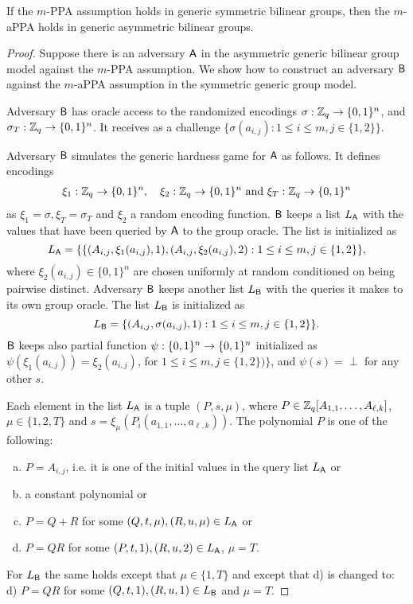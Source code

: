 \begin{theorem}
	If the $m$-PPA assumption holds in generic symmetric bilinear groups, then the $m$-aPPA holds in generic asymmetric bilinear groups.
\end{theorem}
\begin{proof}
Suppose there is an adversary $\mathsf{A}$  in the asymmetric generic bilinear group model against the $m$-PPA assumption.  We show how to construct an adversary $\mathsf{B}$ against the  $m$-aPPA assumption in the symmetric generic group model. 


Adversary $\mathsf{B}$ has oracle access to the randomized encodings $\sigma: \mathbb{Z}_q \to \{0,1\}^n$, 
and $\sigma_T: \mathbb{Z}_q \to \{0,1\}^n$. It receives as a challenge $\{ \sigma(a_{i,j}):1\leq i \leq m, j\in\{1,2\}\}$.

Adversary $\mathsf{B}$ simulates the generic hardness game for $\mathsf{A}$ as follows. It defines encodings  
\begin{align*}
	\xi_1: \mathbb{Z}_q \to \{0,1\}^n,\quad \xi_2: \mathbb{Z}_q \to \{0,1\}^n \text{ and }\xi_T: \mathbb{Z}_q \to \{0,1\}^n 
\end{align*}
as $\xi_1=\sigma, \xi_T=\sigma_T$ and $\xi_2$ a random encoding function. $\mathsf{B}$ keeps a list $L_{\mathsf{A}}$  with the values that have been queried by $\mathsf{A}$ to the group oracle. The list is initialized as 
$$L_{\mathsf{A}}=\{  \{(A_{i,j},\xi_1(a_{i,j}),1),(A_{i,j},\xi_2(a_{i,j}),2):1\leq i \leq m, j \in \{1,2\}\},$$
where $\xi_2(a_{i,j}) \in \{0,1\}^n$ are chosen uniformly at random conditioned on being pairwise distinct.  Adversary $\mathsf{B}$ keeps another list $L_{\mathsf{B}}$ with the queries 
it makes to its own group oracle. The list $L_{\mathsf{B}}$ is initialized as 
$$L_{\mathsf{B}}=\{(A_{i,j},\sigma(a_{i,j}),1):1\leq i \leq m, j \in \{1,2\}\}.$$
$\mathsf{B}$ keeps also partial function $\psi:\{0,1\}^n\to\{0,1\}^n$ initialized as
$ \psi(\xi_1(a_{i,j}))=\xi_2(a_{i,j})$, for $1\leq i\leq m,j\in\{1,2\})\}$, and $\psi(s)=\perp$ for any other $s$.

Each element in the list $L_{\mathsf{A}}$ is a tuple $(P,s,\mu)$, where $P \in \mathbb{Z}_q[A_{1,1}, \ldots,A_{\ell,k}]$, $\mu \in \{1,2,T\}$ and $s=\xi_{\mu}(P_i(a_{1,1},\ldots,a_{\ell,k}))$. The polynomial $P$ is one of the following: 
\begin{enumerate}[a)]
	\item $P=A_{i,j}$, i.e. it is one of the initial values in the query list  
$L_{\mathsf{A}}$  or 
	\item a constant polynomial or
	\item $P=Q+R$ for some $(Q,t,\mu),(R,u,\mu) \in L_{\mathsf{A}}$ or
	\item $P=QR$ for some $(P,t,1),(R,u,2) \in L_{\mathsf{A}}$, $\mu=T$.
\end{enumerate}
	For $L_{\mathsf{B}}$ the same holds except that $\mu \in \{1,T\}$ and except that d) is changed to: d) $P=QR$ for some $(Q,t,1),(R,u,1) \in L_{\mathsf{B}}$ and $\mu=T$. 


\end{proof}
